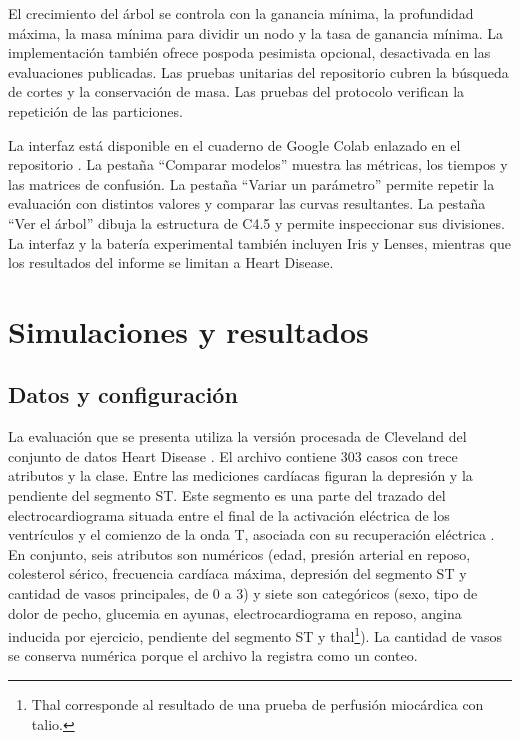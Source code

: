 \documentclass[runningheads]{llncs}
\begin{document}
El crecimiento del árbol se controla con la ganancia mínima, la profundidad máxima, la masa mínima para dividir un nodo y la tasa de ganancia mínima. La implementación también ofrece pospoda pesimista opcional, desactivada en las evaluaciones publicadas. Las pruebas unitarias del repositorio cubren la búsqueda de cortes y la conservación de masa. Las pruebas del protocolo verifican la repetición de las particiones.

La interfaz está disponible en el cuaderno de Google Colab enlazado en el repositorio \cite{repositorio2026}. La pestaña ``Comparar modelos'' muestra las métricas, los tiempos y las matrices de confusión. La pestaña ``Variar un parámetro'' permite repetir la evaluación con distintos valores y comparar las curvas resultantes. La pestaña ``Ver el árbol'' dibuja la estructura de C4.5 y permite inspeccionar sus divisiones. La interfaz y la batería experimental también incluyen Iris y Lenses, mientras que los resultados del informe se limitan a Heart Disease.

\section{Simulaciones y resultados}

\subsection{Datos y configuración}

La evaluación que se presenta utiliza la versión procesada de Cleveland del conjunto de datos Heart Disease \cite{heartDisease}. El archivo contiene 303 casos con trece atributos y la clase. Entre las mediciones cardíacas figuran la depresión y la pendiente del segmento ST. Este segmento es una parte del trazado del electrocardiograma situada entre el final de la activación eléctrica de los ventrículos y el comienzo de la onda T, asociada con su recuperación eléctrica \cite{meek2002}. En conjunto, seis atributos son numéricos (edad, presión arterial en reposo, colesterol sérico, frecuencia cardíaca máxima, depresión del segmento ST y cantidad de vasos principales, de 0 a 3) y siete son categóricos (sexo, tipo de dolor de pecho, glucemia en ayunas, electrocardiograma en reposo, angina inducida por ejercicio, pendiente del segmento ST y thal\footnote{Thal corresponde al resultado de una prueba de perfusión miocárdica con talio.}). La cantidad de vasos se conserva numérica porque el archivo la registra como un conteo.
\end{document}

